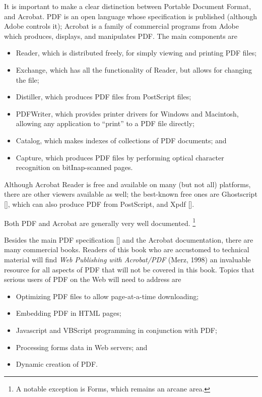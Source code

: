 It is important to make a clear distinction between Portable Document Format, 
and Acrobat. PDF is an open language whose specification is published (although 
Adobe controls it); Acrobat is a family of commercial programs from Adobe which 
produces, displays, and manipulates PDF. The main components are 

\begin{itemize}
  \item Reader, which is distributed freely, for simply viewing and printing PDF files; 
  \item Exchange, which has all the functionality of Reader, but allows for changing 
    the file; 
  \item Distiller, which produces PDF files from PostScript files; 
  \item PDFWriter, which provides printer drivers for Windows and
    Macintosh, allowing any application to ``print'' to a PDF file directly; 
  \item Catalog, which makes indexes of collections of PDF documents; and 
  \item Capture, which produces PDF files by performing optical character recognition 
    on bitInap-scanned pages. 
\end{itemize}

Although Acrobat Reader is free and available on many (but not all)
platforms, there are other viewers available as well; the best-known
free ones are Ghostscript [], which can also produce PDF from
PostScript, and Xpdf []. 

Both PDF and Acrobat are generally very well documented. \footnote{A notable exception is Forms, which remains an arcane area.}

Besides the main PDF specification [] and the Acrobat documentation,
there are many commercial books. Readers of this book who are accustomed
to technical material will find \emph{Web Publishing with Acrobat/PDF}
(Merz, 1998) an invaluable resource for all aspects of PDF that will not
be covered in this book. Topics that serious users of PDF on the Web
will need to address are 

\begin{itemize}
  \item Optimizing PDF files to allow page-at-a-time downloading; 
  \item Embedding PDF in HTML pages; 
  \item Javascript and VBScript programming in conjunction with PDF; 
  \item Processing forms data in Web servers; and 
  \item Dynamic creation of PDF. 
\end{itemize}

